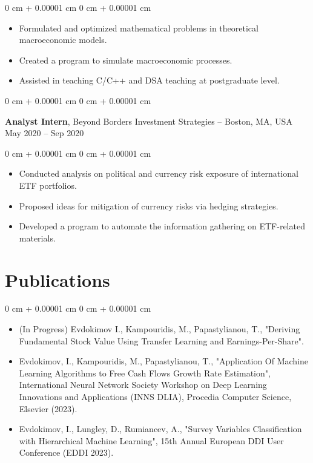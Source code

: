 \documentclass[10pt, letterpaper]{article}
\newenvironment{highlights}{
    \begin{itemize}[
        topsep=0.10 cm,
        parsep=0.10 cm,
        partopsep=0pt,
        itemsep=0pt,
        leftmargin=0 cm + 10pt
    ]
}{
    \end{itemize}
} %
\newenvironment{onecolentry}{
    \begin{adjustwidth}{
        0 cm + 0.00001 cm
    }{
        0 cm + 0.00001 cm
    }
}{
    \end{adjustwidth}
} %
\newenvironment{twocolentry}[2][]{
    \onecolentry
    \def\secondColumn{#2}
    \setcolumnwidth{\fill, 4.5 cm}
    \begin{paracol}{2}
}{
    \switchcolumn \raggedleft \secondColumn
    \end{paracol}
    \endonecolentry
} %
\begin{document}
        \vspace{0.10 cm}
        \begin{onecolentry}
            \begin{highlights}
                  \item Formulated and optimized mathematical problems in theoretical macroeconomic models.
                  \item Created a program to simulate macroeconomic processes.
                  \item Assisted in teaching C/C++ and DSA teaching at postgraduate level.
            \end{highlights}
        \end{onecolentry}
    
        \vspace{0.2 cm}

        \begin{twocolentry}{
            May 2020 – Sep 2020
        }
            \textbf{Analyst Intern}, Beyond Borders Investment Strategies -- Boston, MA, USA\end{twocolentry}

        \vspace{0.10 cm}
        \begin{onecolentry}
            \begin{highlights}
              \item Conducted analysis on political and currency risk exposure of international ETF portfolios.
              \item Proposed ideas for mitigation of currency risks via hedging strategies.
              \item Developed a program to automate the information gathering on ETF-related materials.
            \end{highlights}
        \end{onecolentry}
    \section{Publications}

    \begin{onecolentry}
        \begin{highlights}
            \item (In Progress) Evdokimov I., Kampouridis, M., Papastylianou, T., "Deriving Fundamental Stock Value Using Transfer Learning and Earnings-Per-Share".
            \item Evdokimov, I., Kampouridis, M., Papastylianou, T., "Application Of Machine Learning Algorithms to Free Cash Flows Growth Rate Estimation", International Neural Network Society Workshop on Deep Learning Innovations and Applications (INNS DLIA), Procedia Computer Science, Elsevier (2023).
            \item Evdokimov, I., Lungley, D., Rumiancev, A., "Survey Variables Classification with Hierarchical Machine Learning", 15th Annual European DDI User Conference (EDDI 2023).
        \end{highlights}
    \end{onecolentry}
\end{document}

